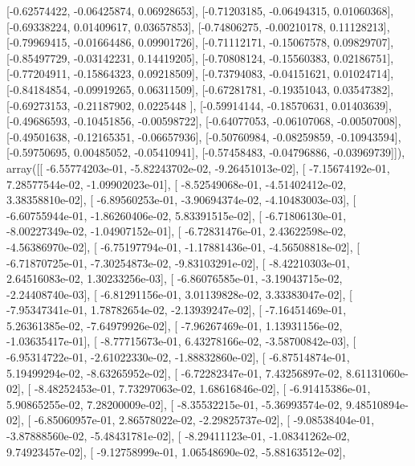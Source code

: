 \documentclass{article}
\begin{document}
       [-0.62574422, -0.06425874,  0.06928653],
       [-0.71203185, -0.06494315,  0.01060368],
       [-0.69338224,  0.01409617,  0.03657853],
       [-0.74806275, -0.00210178,  0.11128213],
       [-0.79969415, -0.01664486,  0.09901726],
       [-0.71112171, -0.15067578,  0.09829707],
       [-0.85497729, -0.03142231,  0.14419205],
       [-0.70808124, -0.15560383,  0.02186751],
       [-0.77204911, -0.15864323,  0.09218509],
       [-0.73794083, -0.04151621,  0.01024714],
       [-0.84184854, -0.09919265,  0.06311509],
       [-0.67281781, -0.19351043,  0.03547382],
       [-0.69273153, -0.21187902,  0.0225448 ],
       [-0.59914144, -0.18570631,  0.01403639],
       [-0.49686593, -0.10451856, -0.00598722],
       [-0.64077053, -0.06107068, -0.00507008],
       [-0.49501638, -0.12165351, -0.06657936],
       [-0.50760984, -0.08259859, -0.10943594],
       [-0.59750695,  0.00485052, -0.05410941],
       [-0.57458483, -0.04796886, -0.03969739]]), array([[ -6.55774203e-01,  -5.82243702e-02,  -9.26451013e-02],
       [ -7.15674192e-01,   7.28577544e-02,  -1.09902023e-01],
       [ -8.52549068e-01,  -4.51402412e-02,   3.38358810e-02],
       [ -6.89560253e-01,  -3.90694374e-02,  -4.10483003e-03],
       [ -6.60755944e-01,  -1.86260406e-02,   5.83391515e-02],
       [ -6.71806130e-01,  -8.00227349e-02,  -1.04907152e-01],
       [ -6.72831476e-01,   2.43622598e-02,  -4.56386970e-02],
       [ -6.75197794e-01,  -1.17881436e-01,  -4.56508818e-02],
       [ -6.71870725e-01,  -7.30254873e-02,  -9.83103291e-02],
       [ -8.42210303e-01,   2.64516083e-02,   1.30233256e-03],
       [ -6.86076585e-01,  -3.19043715e-02,  -2.24408740e-03],
       [ -6.81291156e-01,   3.01139828e-02,   3.33383047e-02],
       [ -7.95347341e-01,   1.78782654e-02,  -2.13939247e-02],
       [ -7.16451469e-01,   5.26361385e-02,  -7.64979926e-02],
       [ -7.96267469e-01,   1.13931156e-02,  -1.03635417e-01],
       [ -8.77715673e-01,   6.43278166e-02,  -3.58700842e-03],
       [ -6.95314722e-01,  -2.61022330e-02,  -1.88832860e-02],
       [ -6.87514874e-01,   5.19499294e-02,  -8.63265952e-02],
       [ -6.72282347e-01,   7.43256897e-02,   8.61131060e-02],
       [ -8.48252453e-01,   7.73297063e-02,   1.68616846e-02],
       [ -6.91415386e-01,   5.90865255e-02,   7.28200009e-02],
       [ -8.35532215e-01,  -5.36993574e-02,   9.48510894e-02],
       [ -6.85060957e-01,   2.86578022e-02,  -2.29825737e-02],
       [ -9.08538404e-01,  -3.87888560e-02,  -5.48431781e-02],
       [ -8.29411123e-01,  -1.08341262e-02,   9.74923457e-02],
       [ -9.12758999e-01,   1.06548690e-02,  -5.88163512e-02],
\end{document}
